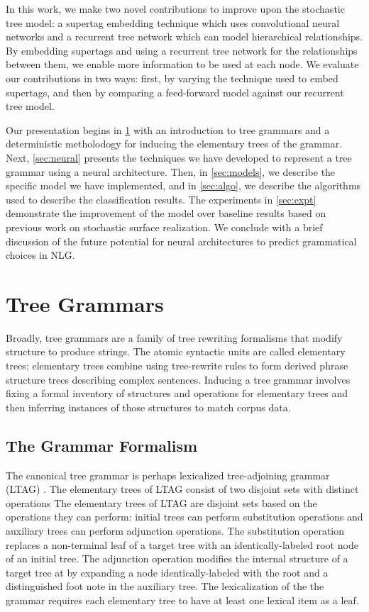 \documentclass[11pt]{article}
\begin{document}
In this work, we make two novel contributions to improve upon the stochastic tree model:
a supertag embedding technique which uses convolutional neural networks and
a recurrent tree network which can model hierarchical relationships.
%
By embedding supertags and using a recurrent tree network for the relationships between them,
we enable more information to be used at each node.
%
We evaluate our contributions in two ways: first, by varying the technique used to embed
supertags, and then by comparing a feed-forward model against our
recurrent tree model.


Our presentation begins in \ref{sec:tree} with an introduction to tree
grammars and a deterministic metholodogy for inducing the elementary trees of the grammar.
%
Next, \ref{sec:neural} presents the techniques we have developed to represent
a tree grammar using a neural architecture.
%
Then, in \ref{sec:models}, we describe the specific model we have
implemented, and in \ref{sec:algo}, we describe the algorithms used to describe the classification results.
%
The experiments in \ref{sec:expt} demonstrate the improvement of the
model over baseline results based on previous work on stochastic
surface realization.
%
We conclude with a brief discussion of the future potential for neural
architectures to predict grammatical choices in NLG.

\section{Tree Grammars}
\label{sec:tree}

Broadly, tree grammars are a family of tree rewriting formalisms that
modify structure to produce strings.  The atomic syntactic units are
called elementary trees; elementary trees combine using tree-rewrite
rules to form derived phrase structure trees describing complex
sentences.  Inducing a tree grammar involves fixing a formal inventory
of structures and operations for elementary trees and then inferring
instances of those structures to match corpus data.

\subsection{The Grammar Formalism}

The canonical tree grammar is perhaps lexicalized tree-adjoining
grammar (LTAG) \cite{joshi1991tree}.
%
The elementary trees of LTAG consist of two disjoint sets with distinct operations
The elementary trees of LTAG are disjoint sets based on the operations
they can perform: initial trees can perform substitution operations
and auxiliary trees can perform adjunction operations.
%
The substitution operation replaces a non-terminal leaf of a target
tree with an identically-labeled root node of an initial tree.
%
The adjunction operation modifies the internal structure of a target
tree at by expanding a node identically-labeled with the root and a
distinguished foot note in the auxiliary tree.
%
The lexicalization of the the grammar requires each elementary tree to
have at least one lexical item as a leaf.
\end{document}
